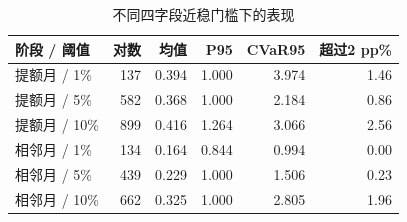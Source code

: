 \begin{table}[H]\centering\caption{不同四字段近稳门槛下的表现}
\fontsize{9bp}{12bp}\selectfont
\begin{tabularx}{\linewidth}{@{}Yrrrrr@{}}\toprule
阶段 / 阈值 & 对数 & 均值 & P95 & CVaR95 & 超过2 pp\%\\\midrule
提额月 / 1\% & 137 & 0.394 & 1.000 & 3.974 & 1.46\\
提额月 / 5\% & 582 & 0.368 & 1.000 & 2.184 & 0.86\\
提额月 / 10\% & 899 & 0.416 & 1.264 & 3.066 & 2.56\\
相邻月 / 1\% & 134 & 0.164 & 0.844 & 0.994 & 0.00\\
相邻月 / 5\% & 439 & 0.229 & 1.000 & 1.506 & 0.23\\
相邻月 / 10\% & 662 & 0.325 & 1.000 & 2.805 & 1.96\\
\bottomrule\end{tabularx}
\end{table}